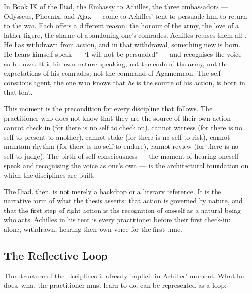 In Book IX of the Iliad, the Embassy to Achilles, the three ambassadors ---
Odysseus, Phoenix, and Ajax --- come to Achilles' tent to persuade him to return
to the war. Each offers a different reason: the honour of the army, the love of
a father-figure, the shame of abandoning one's comrades. Achilles refuses them
all \parencite[IX]{homer2011iliad}. He has withdrawn from action, and in that
withdrawal, something new is born. He hears himself speak --- ``I will not be
persuaded'' --- and recognises the voice as his own. It is his own nature
speaking, not the code of the army, not the expectations of his comrades, not
the command of Agamemnon. The self-conscious agent, the one who knows that
\emph{he} is the source of his action, is born in that tent.

This moment is the precondition for every discipline that follows. The
practitioner who does not know that they are the source of their own action
cannot check in (for there is no self to check on), cannot witness (for there
is no self to present to another), cannot stake (for there is no self to risk),
cannot maintain rhythm (for there is no self to endure), cannot review (for
there is no self to judge). The birth of self-consciousness --- the moment of
hearing oneself speak and recognising the voice as one's own --- is the
architectural foundation on which the disciplines are built.

The Iliad, then, is not merely a backdrop or a literary reference. It is the
narrative form of what the thesis asserts: that action is governed by nature,
and that the first step of right action is the recognition of oneself as a
natural being who acts. Achilles in his tent is every practitioner before their
first check-in: alone, withdrawn, hearing their own voice for the first time.

\subsection{The Reflective Loop}

The structure of the disciplines is already implicit in Achilles' moment. What
he does, what the practitioner must learn to do, can be represented as a loop:

